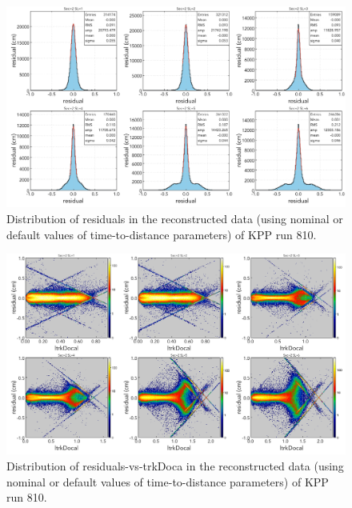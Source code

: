 \documentclass[12pt,epsfig]{article}
\begin{document}
\begin{figure}[H]
    \centering
    \includegraphics[width=1.0\textwidth]{Figures/residual_defaultT2D_automatedT0.png}
    \caption{Distribution of residuals in the reconstructed data (using nominal or default values of time-to-distance parameters) of KPP run 810.}
    \label{fResidualsDefAllSL}
\end{figure}

\begin{figure}[H]
    \centering
    \includegraphics[width=1.0\textwidth]{Figures/residual_vs_trkDoca_defaultT2D_automatedT0.png}
    \caption{Distribution of residuals-vs-trkDoca in the reconstructed data (using nominal or default values of time-to-distance parameters) of KPP run 810.}
    \label{fResidualsVsDocaDefAllSL}
\end{figure}
\end{document}
